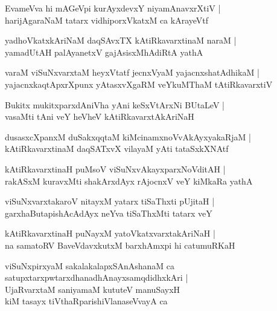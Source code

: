 \documentclass[twoside,12pt,openright]{book}
\newcounter{shloka}[chapter]
\begin{document}
\begin{shloka}%
EvameVva hi mAGeVpi kurAyxdevxY niyamAnavxrXtiV |\\
harijAgaraNaM tatarx vidhiporxVkatxM ca kArayeVtf
\end{shloka}

\begin{shloka}%
yadhoVkatxkAriNaM daqSAvxTX kAtiRkavarxtinaM naraM |\\
yamadUtAH palAyanetxV gajAsisxMhAdiRtA yathA 
\end{shloka}

\begin{shloka}%
varaM viSuNxvarxtaM heyxVtatf jecnxVyaM yajacnxshatAdhikaM |\\
yajacnxkaqtApxrXpunx yAtasxvXgaRM veYkuMThaM tAtiRkavarxtiV 
\end{shloka}

\begin{shloka}%
Bukitx mukitxparxdAniVha yAni keSxVtArxNi BUtaLeV |\\
vasaMti tAni veY heVheV kAtiRkavarxtAkAriNaH 
\end{shloka}

\begin{shloka}%
dusasxcXpanxM duSakxqqtaM kiMcinamxnoVvAkAyxyakaRjaM |\\
kAtiRkavarxtinaM daqSATxvX vilayaM yAti tataSxkXNAtf
\end{shloka}

\begin{shloka}%
kAtiRkavarxtinaH puMsoV viSuNxvAkayxparxNoVditAH |\\
rakASxM kuravxMti shakArxdAyx rAjocnxV veY kiMkaRa yathA 
\end{shloka}

\begin{shloka}%
viSuNxvarxtakaroV nitayxM yatarx tiSaThxti pUjitaH |\\
garxhaButapishAcAdAyx neYva tiSaThxMti tatarx veY 
\end{shloka}

\begin{shloka}%
kAtiRkavarxtinaH puNayxM yatoVkatxvarxtakAriNaH |\\
na samatoRV BaveVdavxkutxM barxhAmxpi hi catumuRKaH 
\end{shloka}

\begin{shloka}%
viSuNxpirxyaM sakalakalapxSAnAshanaM ca \\
satupxtarxpwtarxdhanadhAnayxsamqdidhxkAri |\\
UjaRvarxtaM saniyamaM kututeV manuSayxH \\
kiM tasayx tiVthaRparishiVlanaseVvayA ca 
\end{shloka}
\end{document}

